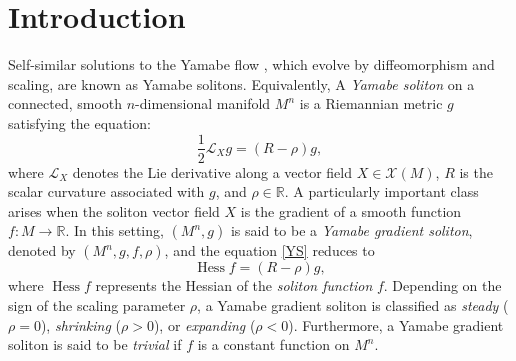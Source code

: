 \documentclass[11pt]{amsart}
\DeclareMathOperator{\Hessian}{Hess}
\numberwithin{equation}{section}
\begin{document}
\section{\textbf{Introduction}}
 Self-similar solutions to the Yamabe flow \cite{HA1}, which evolve by diffeomorphism and scaling, are known as Yamabe solitons. Equivalently, 
A \textit{Yamabe soliton} on a connected, smooth $n$-dimensional manifold $M^n$ is a Riemannian metric $g$ satisfying the equation:
\begin{equation} \label{YS}
    \frac{1}{2} \mathcal{L}_X g = (R - \rho)g,
\end{equation}
where $\mathcal{L}_X$ denotes the Lie derivative along a vector field $X \in \mathcal{X}(M)$, $R$ is the scalar curvature associated with $g$, and $\rho \in 
\mathbb{R}$. A particularly important class arises when the soliton vector field $X$ is the
gradient of a smooth function $f: M \rightarrow \mathbb{R}$. In this setting, $(M^n, g)$ is said to be a \textit{Yamabe gradient soliton}, denoted by 
$(M^n, g, f, \rho)$, and the equation \eqref{YS} reduces to 
\begin{equation}\label{GYS}
    \Hessian f =(R - \rho)g,
\end{equation}
where $\Hessian f$ represents the Hessian of the \textit{soliton function} $f$. Depending on the sign of the scaling parameter $\rho$, a Yamabe gradient soliton is classified 
as \textit{steady} ($\rho = 0$), \textit{shrinking} ($\rho > 0$), or \textit{expanding} ($\rho < 0$). Furthermore, a Yamabe gradient soliton is said to be \textit{trivial} if $f$ is a constant function on $M^n$. 
\end{document}
